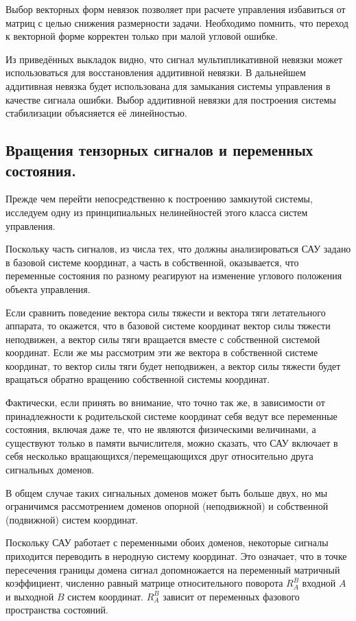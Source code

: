 \documentclass[a4paper]{article}
\begin{document}
Выбор векторных форм невязок позволяет при расчете управления избавиться от матриц с целью снижения размерности задачи. Необходимо помнить, что переход к векторной форме корректен только при малой угловой ошибке.

Из приведённых выкладок видно, что сигнал мультипликативной невязки может использоваться для восстановления аддитивной невязки. В дальнейшем аддитивная невязка будет использована для замыкания системы управления в качестве сигнала ошибки. Выбор аддитивной невязки для построения системы стабилизации объясняется её линейностью.

\subsection{Вращения тензорных сигналов и переменных состояния.}
Прежде чем перейти непосредственно к построению замкнутой системы, исследуем одну из принципиальных нелинейностей этого класса систем управления.

Поскольку часть сигналов, из числа тех, что должны анализироваться САУ задано в базовой системе координат, а часть в собственной, оказывается, что переменные состояния по разному реагируют на изменение углового положения объекта управления. 

Если сравнить поведение вектора силы тяжести и вектора тяги летательного аппарата, то окажется, что в базовой системе координат вектор силы тяжести неподвижен, а вектор силы тяги вращается вместе с собственной системой координат. Если же мы рассмотрим эти же вектора в собственной системе координат, то вектор силы тяги будет неподвижен, а вектор силы тяжести будет вращаться обратно вращению собственной системы координат.

Фактически, если принять во внимание, что точно так же, в зависимости от принадлежности к родительской системе координат себя ведут все переменные состояния, включая даже те, что не являются физическими величинами, а существуют только в памяти вычислителя, можно сказать, что САУ включает в себя несколько вращающихся/перемещающихся друг относительно друга сигнальных доменов.

В общем случае таких сигнальных доменов может быть больше двух, но мы ограничимся рассмотрением доменов опорной (неподвижной) и собственной (подвижной) систем координат. 

Поскольку САУ работает с переменными обоих доменов, некоторые сигналы приходится переводить в неродную систему координат. Это означает, что в точке пересечения границы домена сигнал допомножается на переменный матричный коэффициент, численно равный матрице относительного поворота $R_A^B$ входной $A$ и выходной $B$ систем координат. $R_A^B$ зависит от переменных фазового пространства состояний.
\end{document}
